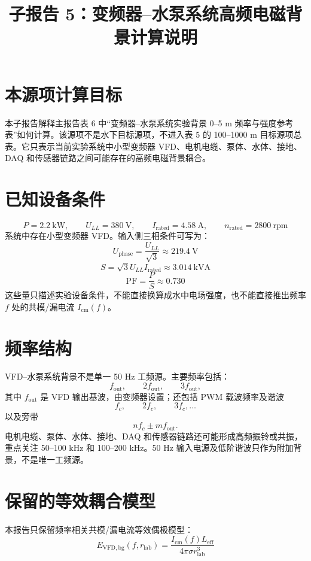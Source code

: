 \documentclass[UTF8,a4paper,11pt]{ctexart}
\title{子报告 5：变频器--水泵系统高频电磁背景计算说明}
\author{}
\date{}
\begin{document}
\maketitle

\section{本源项计算目标}
本子报告解释主报告表 6 中“变频器--水泵系统实验背景 0--5 m 频率与强度参考表”如何计算。该源项不是水下目标源项，不进入表 5 的 100--1000 m 目标源项总表。它只表示当前实验系统中小型变频器 VFD、电机电缆、泵体、水体、接地、DAQ 和传感器链路之间可能存在的高频电磁背景耦合。

\section{已知设备条件}
\[
P=2.2\ \mathrm{kW},\qquad U_{LL}=380\ \mathrm{V},\qquad
I_{\mathrm{rated}}=4.58\ \mathrm{A},\qquad n_{\mathrm{rated}}=2800\ \mathrm{rpm}
\]
系统中存在小型变频器 VFD。输入侧三相条件可写为：
\[
U_{\mathrm{phase}}=\frac{U_{LL}}{\sqrt{3}}\approx219.4\ \mathrm{V}
\]
\[
S=\sqrt{3}U_{LL}I_{\mathrm{rated}}\approx3.014\ \mathrm{kVA}
\]
\[
\mathrm{PF}=\frac{P}{S}\approx0.730
\]
这些量只描述实验设备条件，不能直接换算成水中电场强度，也不能直接推出频率 $f$ 处的共模/漏电流 $I_{\mathrm{cm}}(f)$。

\section{频率结构}
VFD--水泵系统背景不是单一 50 Hz 工频源。主要频率包括：
\[
f_{\mathrm{out}},\qquad 2f_{\mathrm{out}},\qquad 3f_{\mathrm{out}},
\]
其中 $f_{\mathrm{out}}$ 是 VFD 输出基波，由变频器设置；还包括 PWM 载波频率及谐波
\[
f_c,\qquad 2f_c,\qquad 3f_c,\ldots
\]
以及旁带
\[
nf_c\pm mf_{\mathrm{out}}.
\]
电机电缆、泵体、水体、接地、DAQ 和传感器链路还可能形成高频振铃或共振，重点关注 50--100 kHz 和 100--200 kHz。50 Hz 输入电源及低阶谐波只作为附加背景，不是唯一工频源。

\section{保留的等效耦合模型}
本报告只保留频率相关共模/漏电流等效偶极模型：
\[
E_{\mathrm{VFD,bg}}(f,r_{\mathrm{lab}})=
\frac{I_{\mathrm{cm}}(f)L_{\mathrm{eff}}}{4\pi\sigma r_{\mathrm{lab}}^3}
\]
\end{document}

